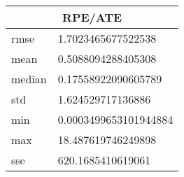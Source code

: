 \begin{table}[!ht] 
 \centering 
 \begin{tabular}{|l|l|} \hline 
 \multicolumn{2}{|c|}{RPE/ATE} \\ \hline 
 rmse & 1.7023465677522538 \\ \hline 
mean & 0.5088094288405308 \\ \hline 
median & 0.17558922090605789 \\ \hline 
std & 1.624529717136886 \\ \hline 
min & 0.0003499653101944884 \\ \hline 
max & 18.487619746249898 \\ \hline 
sse & 620.1685410619061 \\ \hline 
\end{tabular} 
 \end{table}